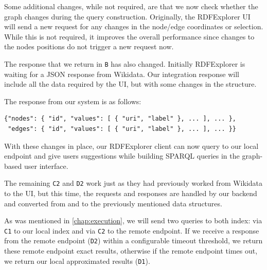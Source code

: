 Some additional changes, while not required, are that we now check whether the graph  changes during the query construction. Originally, the RDFExplorer UI will send a new request for any changes in the node/edge coordinates or selection. While this is not required, it improves the overall performance since changes to the nodes positions do not trigger a new request now. 

The response that we return in \texttt{B} has also changed. Initially RDFExplorer is waiting for a JSON response from Wikidata. Our integration response will include all the data required by the UI, but with some changes in the structure. 

The response from our system is as follows:
\begin{verbatim}
{"nodes": { "id", "values": [ { "uri", "label" }, ... ], ... },
 "edges": { "id", "values": [ { "uri", "label" }, ... ], ... }}
\end{verbatim}

With these changes in place, our RDFExplorer client can now query to our local endpoint and give users suggestions while building SPARQL queries in the graph-based user interface.

The remaining \texttt{C2} and \texttt{D2} work just as they had previously worked from Wikidata to the UI, but this time, the requests and responses are handled by our backend and converted from and to the previously mentioned data structures.

As was mentioned in \autoref{chap:execution}, we will send two queries to both index: via \texttt{C1} to our local index and via \texttt{C2} to the remote endpoint. If we receive a response from the remote endpoint (\texttt{D2}) within a configurable timeout threshold, we return these remote endpoint exact results, otherwise if the remote endpoint times out, we return our local approximated results (\texttt{D1}).
